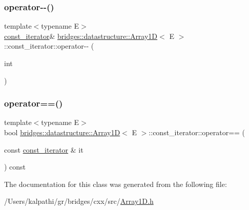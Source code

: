 \mbox{\label{classbridges_1_1datastructure_1_1_array1_d_1_1const__iterator_a815972df8b28780f88dac8133322e8ab}} 
\subsubsection{\texorpdfstring{operator-\/-\/()}{operator--()}\hspace{0.1cm}{\footnotesize\ttfamily [2/2]}}
{\footnotesize\ttfamily template$<$typename E$>$ \\
\mbox{\hyperlink{classbridges_1_1datastructure_1_1_array1_d_1_1const__iterator}{const\+\_\+iterator}}\& \mbox{\hyperlink{classbridges_1_1datastructure_1_1_array1_d}{bridges\+::datastructure\+::\+Array1D}}$<$ E $>$\+::const\+\_\+iterator\+::operator-\/-\/ (\begin{DoxyParamCaption}\item[{int}]{ }\end{DoxyParamCaption})\hspace{0.3cm}{\ttfamily [inline]}}

\mbox{\label{classbridges_1_1datastructure_1_1_array1_d_1_1const__iterator_a004eca869afdc913a1d1a448bb4b7871}} 
\subsubsection{\texorpdfstring{operator==()}{operator==()}}
{\footnotesize\ttfamily template$<$typename E$>$ \\
bool \mbox{\hyperlink{classbridges_1_1datastructure_1_1_array1_d}{bridges\+::datastructure\+::\+Array1D}}$<$ E $>$\+::const\+\_\+iterator\+::operator== (\begin{DoxyParamCaption}\item[{const \mbox{\hyperlink{classbridges_1_1datastructure_1_1_array1_d_1_1const__iterator}{const\+\_\+iterator}} \&}]{it }\end{DoxyParamCaption}) const\hspace{0.3cm}{\ttfamily [inline]}}



The documentation for this class was generated from the following file\+:\begin{DoxyCompactItemize}
\item 
/\+Users/kalpathi/gr/bridges/cxx/src/\mbox{\hyperlink{_array1_d_8h}{Array1\+D.\+h}}\end{DoxyCompactItemize}
